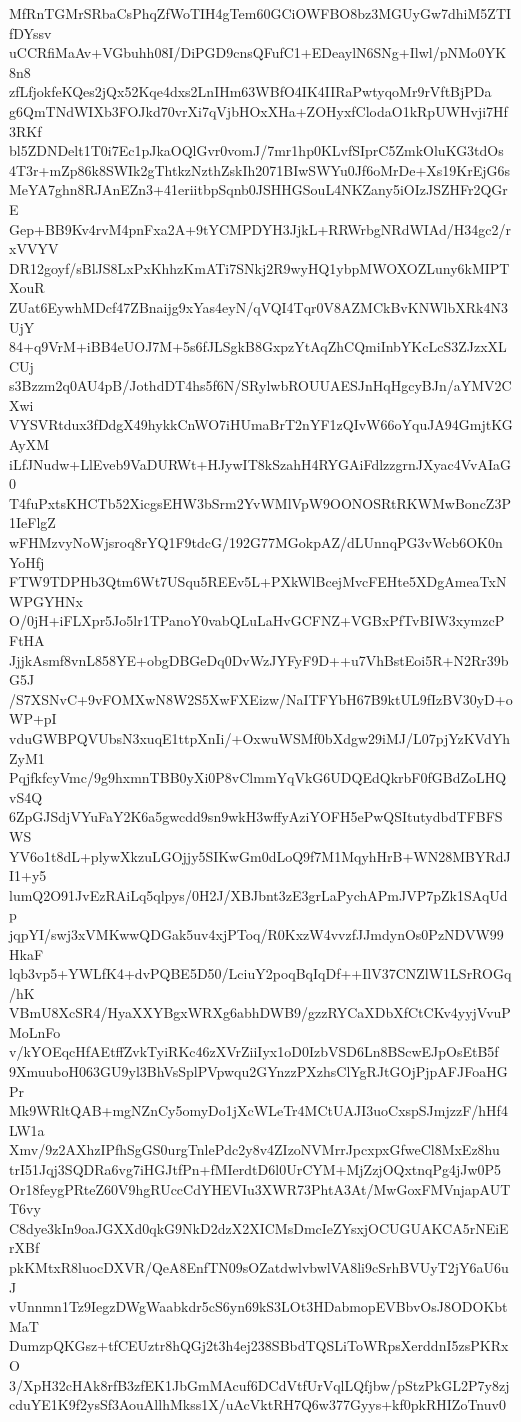 MfRnTGMrSRbaCsPhqZfWoTIH4gTem60GCiOWFBO8bz3MGUyGw7dhiM5ZTIfDYssv
uCCRfiMaAv+VGbuhh08I/DiPGD9cnsQFufC1+EDeaylN6SNg+Ilwl/pNMo0YK8n8
zfLfjokfeKQes2jQx52Kqe4dxs2LnIHm63WBfO4IK4IIRaPwtyqoMr9rVftBjPDa
g6QmTNdWIXb3FOJkd70vrXi7qVjbHOxXHa+ZOHyxfClodaO1kRpUWHvji7Hf3RKf
bl5ZDNDelt1T0i7Ec1pJkaOQlGvr0vomJ/7mr1hp0KLvfSIprC5ZmkOluKG3tdOs
4T3r+mZp86k8SWIk2gThtkzNzthZskIh2071BIwSWYu0Jf6oMrDe+Xs19KrEjG6s
MeYA7ghn8RJAnEZn3+41eriitbpSqnb0JSHHGSouL4NKZany5iOIzJSZHFr2QGrE
Gep+BB9Kv4rvM4pnFxa2A+9tYCMPDYH3JjkL+RRWrbgNRdWIAd/H34gc2/rxVVYV
DR12goyf/sBlJS8LxPxKhhzKmATi7SNkj2R9wyHQ1ybpMWOXOZLuny6kMIPTXouR
ZUat6EywhMDcf47ZBnaijg9xYas4eyN/qVQI4Tqr0V8AZMCkBvKNWlbXRk4N3UjY
84+q9VrM+iBB4eUOJ7M+5s6fJLSgkB8GxpzYtAqZhCQmiInbYKcLcS3ZJzxXLCUj
s3Bzzm2q0AU4pB/JothdDT4hs5f6N/SRylwbROUUAESJnHqHgcyBJn/aYMV2CXwi
VYSVRtdux3fDdgX49hykkCnWO7iHUmaBrT2nYF1zQIvW66oYquJA94GmjtKGAyXM
iLfJNudw+LlEveb9VaDURWt+HJywIT8kSzahH4RYGAiFdlzzgrnJXyac4VvAIaG0
T4fuPxtsKHCTb52XicgsEHW3bSrm2YvWMlVpW9OONOSRtRKWMwBoncZ3P1IeFlgZ
wFHMzvyNoWjsroq8rYQ1F9tdcG/192G77MGokpAZ/dLUnnqPG3vWcb6OK0nYoHfj
FTW9TDPHb3Qtm6Wt7USqu5REEv5L+PXkWlBcejMvcFEHte5XDgAmeaTxNWPGYHNx
O/0jH+iFLXpr5Jo5lr1TPanoY0vabQLuLaHvGCFNZ+VGBxPfTvBIW3xymzcPFtHA
JjjkAsmf8vnL858YE+obgDBGeDq0DvWzJYFyF9D++u7VhBstEoi5R+N2Rr39bG5J
/S7XSNvC+9vFOMXwN8W2S5XwFXEizw/NaITFYbH67B9ktUL9fIzBV30yD+oWP+pI
vduGWBPQVUbsN3xuqE1ttpXnIi/+OxwuWSMf0bXdgw29iMJ/L07pjYzKVdYhZyM1
PqjfkfcyVmc/9g9hxmnTBB0yXi0P8vClmmYqVkG6UDQEdQkrbF0fGBdZoLHQvS4Q
6ZpGJSdjVYuFaY2K6a5gwcdd9sn9wkH3wffyAziYOFH5ePwQSItutydbdTFBFSWS
YV6o1t8dL+plywXkzuLGOjjy5SIKwGm0dLoQ9f7M1MqyhHrB+WN28MBYRdJI1+y5
lumQ2O91JvEzRAiLq5qlpys/0H2J/XBJbnt3zE3grLaPychAPmJVP7pZk1SAqUdp
jqpYI/swj3xVMKwwQDGak5uv4xjPToq/R0KxzW4vvzfJJmdynOs0PzNDVW99HkaF
lqb3vp5+YWLfK4+dvPQBE5D50/LciuY2poqBqIqDf++IlV37CNZlW1LSrROGq/hK
VBmU8XcSR4/HyaXXYBgxWRXg6abhDWB9/gzzRYCaXDbXfCtCKv4yyjVvuPMoLnFo
v/kYOEqcHfAEtffZvkTyiRKc46zXVrZiiIyx1oD0IzbVSD6Ln8BScwEJpOsEtB5f
9XmuuboH063GU9yl3BhVsSplPVpwqu2GYnzzPXzhsClYgRJtGOjPjpAFJFoaHGPr
Mk9WRltQAB+mgNZnCy5omyDo1jXcWLeTr4MCtUAJI3uoCxspSJmjzzF/hHf4LW1a
Xmv/9z2AXhzIPfhSgGS0urgTnlePdc2y8v4ZIzoNVMrrJpcxpxGfweCl8MxEz8hu
trI51Jqj3SQDRa6vg7iHGJtfPn+fMIerdtD6l0UrCYM+MjZzjOQxtnqPg4jJw0P5
Or18feygPRteZ60V9hgRUccCdYHEVIu3XWR73PhtA3At/MwGoxFMVnjapAUTT6vy
C8dye3kIn9oaJGXXd0qkG9NkD2dzX2XICMsDmcIeZYsxjOCUGUAKCA5rNEiErXBf
pkKMtxR8luocDXVR/QeA8EnfTN09sOZatdwlvbwlVA8li9cSrhBVUyT2jY6aU6uJ
vUnnmn1Tz9IegzDWgWaabkdr5cS6yn69kS3LOt3HDabmopEVBbvOsJ8ODOKbtMaT
DumzpQKGsz+tfCEUztr8hQGj2t3h4ej238SBbdTQSLiToWRpsXerddnI5zsPKRxO
3/XpH32cHAk8rfB3zfEK1JbGmMAcuf6DCdVtfUrVqlLQfjbw/pStzPkGL2P7y8zj
cduYE1K9f2ysSf3AouAllhMkss1X/uAcVktRH7Q6w377Gyys+kf0pkRHIZoTnuv0
